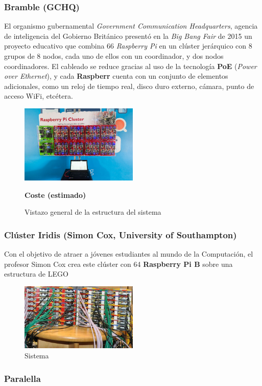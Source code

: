 \subsubsection{Bramble (GCHQ)}

El organismo gubernamental \textit{Government Communication Headquarters}, agencia de inteligencia del Gobierno Británico presentó en la \textit{Big Bang Fair} de 2015 un proyecto educativo que combina 66 \textit{Raspberry Pi} en un clúster jerárquico con 8 grupos de 8 nodos, cada uno de ellos con un coordinador, y dos nodos coordinadores. El cableado se reduce gracias al uso de la tecnología \textbf{PoE} (\textit{Power over Ethernet}), y cada \textbf{Raspberr} cuenta con un conjunto de elementos adicionales, como un reloj de tiempo real, disco duro externo, cámara, punto de acceso WiFi, etcétera\cite{gchqbramble}.

\begin{figure}[H]
\centering
\includegraphics[width=0.5\textwidth]{Chapters/Chapter1/Figures/bramblegchq}
\caption{Vistazo general de la estructura del sistema}
\label{gchq:bramble}

\textbf{Coste (estimado)}\citationneeded

\end{figure}

\subsubsection{Clúster Iridis (Simon Cox, University of Southampton)}

Con el objetivo de atraer a jóvenes estudiantes al mundo de la Computación, el profesor Simon Cox crea este clúster con 64 \textbf{Raspberry Pi B} sobre una estructura de LEGO\cite{cox:raspberry}
\begin{figure}[H]
\centering
\includegraphics[width=0.5\textwidth]{Chapters/Chapter1/Figures/iridis-pi.jpg}
\caption{Sistema}
\label{cox:iridis}

\end{figure}

\subsubsection{Paralella}


